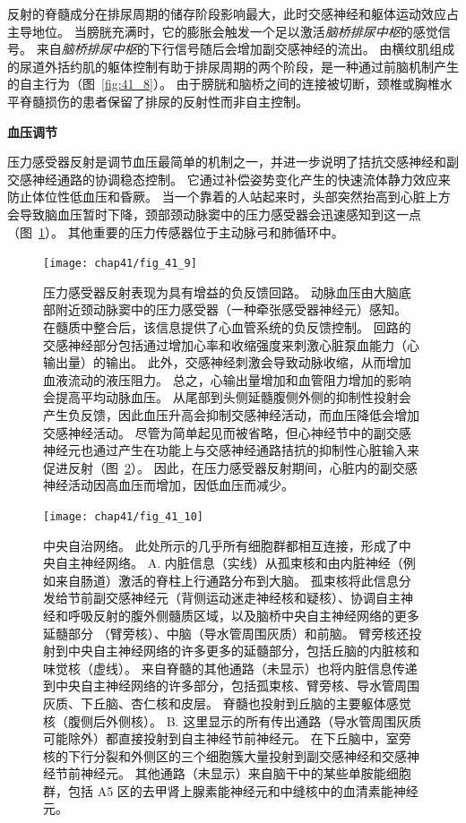 反射的脊髓成分在排尿周期的储存阶段影响最大，此时交感神经和躯体运动效应占主导地位。
当膀胱充满时，它的膨胀会触发一个足以激活\textit{脑桥排尿中枢}的感觉信号。
来自\textit{脑桥排尿中枢}的下行信号随后会增加副交感神经的流出。
由横纹肌组成的尿道外括约肌的躯体控制有助于排尿周期的两个阶段，是一种通过前脑机制产生的自主行为（图~\ref{fig:41_8}）。
由于膀胱和脑桥之间的连接被切断，颈椎或胸椎水平脊髓损伤的患者保留了排尿的反射性而非自主控制。


\textbf{血压调节}

压力感受器反射是调节血压最简单的机制之一，并进一步说明了拮抗交感神经和副交感神经通路的协调稳态控制。
它通过补偿姿势变化产生的快速流体静力效应来防止体位性低血压和昏厥。
当一个靠着的人站起来时，头部突然抬高到心脏上方会导致脑血压暂时下降，颈部颈动脉窦中的压力感受器会迅速感知到这一点（图~\ref{fig:41_9}）。
其他重要的压力传感器位于主动脉弓和肺循环中。


\begin{figure}[htbp]
	\centering
	\texttt{[image: chap41/fig\_41\_9]}
	\caption{压力感受器反射表现为具有增益的负反馈回路。
		动脉血压由大脑底部附近颈动脉窦中的压力感受器（一种牵张感受器神经元）感知。
		在髓质中整合后，该信息提供了心血管系统的负反馈控制。
		回路的交感神经部分包括通过增加心率和收缩强度来刺激心脏泵血能力（心输出量）的输出。
		此外，交感神经刺激会导致动脉收缩，从而增加血液流动的液压阻力。
		总之，心输出量增加和血管阻力增加的影响会提高平均动脉血压。
		从尾部到头侧延髓腹侧外侧的抑制性投射会产生负反馈，因此血压升高会抑制交感神经活动，而血压降低会增加交感神经活动。
		尽管为简单起见而被省略，但心神经节中的副交感神经元也通过产生在功能上与交感神经通路拮抗的抑制性心脏输入来促进反射（图~\ref{fig:41_10}）。
		因此，在压力感受器反射期间，心脏内的副交感神经活动因高血压而增加，因低血压而减少。}
	\label{fig:41_9}
\end{figure}


\begin{figure}[htbp]
	\centering
	\texttt{[image: chap41/fig\_41\_10]}
	\caption{中央自治网络。
		此处所示的几乎所有细胞群都相互连接，形成了中央自主神经网络。
		A. 内脏信息（实线）从孤束核和由内脏神经（例如来自肠道）激活的脊柱上行通路分布到大脑。
		孤束核将此信息分发给节前副交感神经元（背侧运动迷走神经核和疑核）、协调自主神经和呼吸反射的腹外侧髓质区域，以及脑桥中央自主神经网络的更多延髓部分 （臂旁核）、中脑（导水管周围灰质）和前脑。
		臂旁核还投射到中央自主神经网络的许多更多的延髓部分，包括丘脑的内脏核和味觉核（虚线）。
		来自脊髓的其他通路（未显示）也将内脏信息传递到中央自主神经网络的许多部分，包括孤束核、臂旁核、导水管周围灰质、下丘脑、杏仁核和皮层。
		脊髓也投射到丘脑的主要躯体感觉核（腹侧后外侧核）。
		B. 这里显示的所有传出通路（导水管周围灰质可能除外）都直接投射到自主神经节前神经元。
		在下丘脑中，室旁核的下行分裂和外侧区的三个细胞簇大量投射到副交感神经和交感神经节前神经元。
		其他通路（未显示）来自脑干中的某些单胺能细胞群，包括 A5 区的去甲肾上腺素能神经元和中缝核中的血清素能神经元。}
	\label{fig:41_10}
\end{figure}


